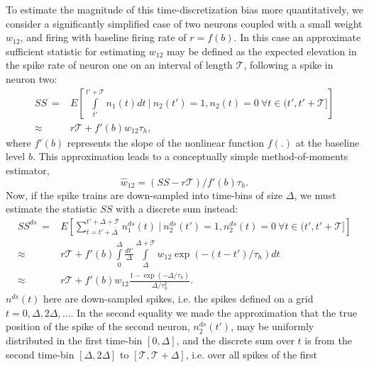 \documentclass[aoas,preprint]{imsart}
\begin{document}
To estimate the magnitude of this time-discretization bias more
quantitatively, we consider a significantly simplified case of two
neurons coupled with a small weight $w_{12}$, and firing with baseline
firing rate of $r=f(b)$.  In this case an approximate sufficient
statistic for estimating $w_{12}$ may be defined as the expected
elevation in the spike rate of neuron one on an interval of length
$\mathcal{T}$, following a spike in neuron two:
\begin{equation}\label{eqn:scale:leadin-1}
\begin{array}{rl}
SS ~ =& E\left[\int\limits_{t'}^{t'+\mathcal{T}} n_1(t) dt ~ \bigg| ~
n_2(t')=1, n_2(t)=0 ~ \forall
t \in (t',t'+\mathcal{T}] \right] \\ \approx & r
\mathcal{T} + f'(b) w_{12}\tau_h,
\end{array}
\end{equation}
where $f'(b)$ represents the slope of the nonlinear function $f(.)$ at
the baseline level $b$.  This approximation leads to a conceptually
simple method-of-moments estimator,
\begin{equation}\label{eqn:scale:leadin-2}
\hat w_{12}=(SS-r\mathcal{T})/f'(b)\tau_h.
\end{equation}
Now, if the spike trains are down-sampled into time-bins of size $\Delta$,
we must estimate the statistic $SS$ with a discrete sum instead:
\begin{equation}\label{eqn:scale:leadin-3}
\begin{array}{rl}
SS^{ds} ~ = &E\left[\sum\limits_{t=t'+\Delta}^{t'+\Delta +
  \mathcal{T}} n^{ds}_1(t) ~ \bigg| ~ n^{ds}_2(t')=1, n^{ds}_2(t)=0\
  \forall t \in (t',t'+\mathcal{T}] \right] \\ \approx& r \mathcal{T}
  + f'(b) \int\limits_0^\Delta \frac{dt'}{\Delta}
  \int\limits_{\Delta}^{\Delta + \mathcal{T}}
  w_{12}\exp(-(t-t')/\tau_h) dt \\ \approx & r \mathcal{T} +
  f'(b)w_{12}\frac{1-\exp(-\Delta/\tau_h)}{\Delta/\tau_h^2}.
\end{array}
\end{equation}
$n^{ds}(t)$ here are down-sampled spikes, i.e. the spikes defined on a
grid $t=0,\Delta,2\Delta,\ldots$.  In the second equality we made the
approximation that the true position of the spike of the second
neuron, $n^{ds}_2(t')$, may be uniformly distributed in the first
time-bin $[0,\Delta]$, and the discrete sum over $t$ is from the
second time-bin $[\Delta,2\Delta]$ to
$[\mathcal{T},\mathcal{T}+\Delta]$, i.e. over all spikes of the first
\end{document}
